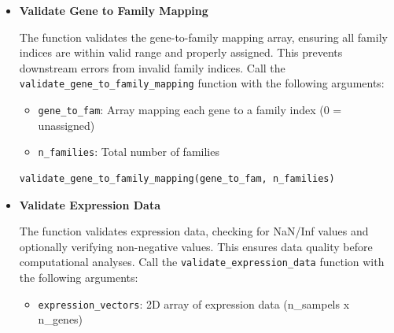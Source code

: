 \documentclass[11pt]{article}
\begin{document}
\begin{enumerate}
\begin{itemize}
\begin{itemize}
	      	      	\item \textbf{n\_genes\_kept}: Number of genes kept after filtering
	      	      \end{itemize}
	      	      
	      	      \begin{lstlisting}[language=Python, caption={Python Filter Unassigned Genes}]
filtered_genes = filter_unassigned_genes(gene_to_fam)
	      	      \end{lstlisting}
	      	      
	      	\item \textbf{Validate Gene to Family Mapping}
	      	      
	      	      The function validates the gene-to-family mapping array, ensuring all
	      	      family indices are within valid range and properly assigned. This prevents
	      	      downstream errors from invalid family indices. Call the \texttt{validate\_gene\_to\_family\_mapping}
	      	      function with the following arguments:
	      	      
	      	      \begin{itemize}
	      	      	\item \texttt{gene\_to\_fam}: Array mapping each gene to a family index
	      	      	      (0 = unassigned)
	      	      	      
	      	      	\item \texttt{n\_families}: Total number of families
	      	      \end{itemize}
	      	      
	      	      \begin{lstlisting}[language=Python, caption={Python Validate Gene to Family Mapping}]
validate_gene_to_family_mapping(gene_to_fam, n_families)
	      	      \end{lstlisting}
	      	      
	      	\item \textbf{Validate Expression Data}
	      	      
	      	      The function validates expression data, checking for NaN/Inf values
	      	      and optionally verifying non-negative values. This ensures data quality
	      	      before computational analyses. Call the \texttt{validate\_expression\_data}
	      	      function with the following arguments:
	      	      
	      	      \begin{itemize}
	      	      	\item \texttt{expression\_vectors}: 2D array of expression data (n\_sampels
	      	      	      x n\_genes)
	      	      	      

\end{itemize}
\end{itemize}
\end{enumerate}
\end{document}
